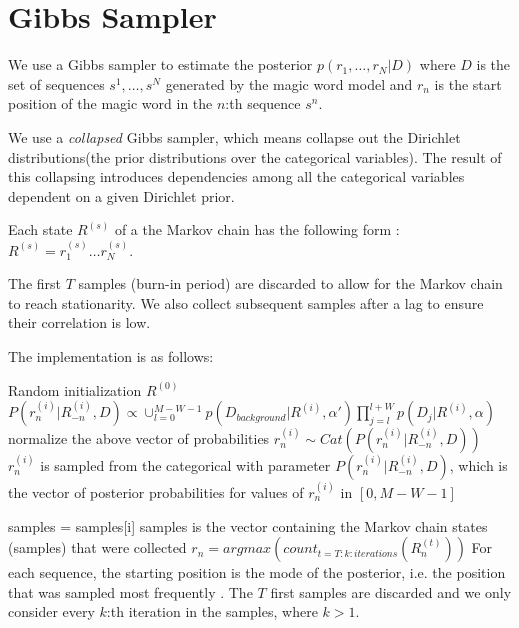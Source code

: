 
\chapter{Gibbs Sampler} %

\label{Gibbs} %


We use a Gibbs sampler to estimate the posterior $p(r_1, \dots, r_N | D)$ where $D$ is the set of sequences $s^1, \dots, s^N$ generated by the magic word model and $r_n$ is the start position of the magic word in the $n$:th sequence $s^n$.

We use a \textit{collapsed} Gibbs sampler, which means collapse out the Dirichlet distributions(the prior distributions over the categorical variables). The result of this collapsing introduces dependencies among all the categorical variables dependent on a given Dirichlet prior.

Each state $R^{(s)}$ of a the Markov chain has the following form : $R^{(s)} = r_1^{(s)} \dots r_N^{(s)}$.

The first $T$ samples (burn-in period) are discarded to allow for the Markov chain to reach stationarity. We also collect subsequent samples after a lag to ensure their correlation is low.

The implementation is as follows: 

\begin{algorithmic}[1]
\State Random initialization $R^{(0)}$
            \State $P(r^{(i)}_{n}|R_{-n}^{(i)}, D) \propto \cup_{l = 0}^{M-W-1} p(D_{background}| R^{(i)},\alpha') \prod\limits_{j = l}^{l + W} p(D_{j}|R^{(i)},\alpha)$
            \State normalize the above vector of probabilities
        \State $r^{(i)}_{n} \sim Cat(P(r^{(i)}_{n}|R_{-n}^{(i)}, D))$ \Comment $r^{(i)}_{n}$ is sampled from the categorical with parameter $P(r^{(i)}_{n}|R_{-n}^{(i)}, D)$, which is the vector of posterior probabilities for values of $r^{(i)}_{n}$ in $[0, M-W-1]$
    \EndFor
\EndFor

    \State samples = samples[i] \Comment samples is the vector containing the Markov chain states (samples) that were collected
    \State $r_n = argmax(count_{t = T:k:iterations}(R^{(t)}_{n}))$ \Comment For each sequence, the starting position is the mode of the posterior, i.e. the position that was sampled most frequently . The $T$ first samples are discarded and we only consider every $k$:th iteration in the samples, where $k > 1$.
\EndFor
\end{algorithmic}

